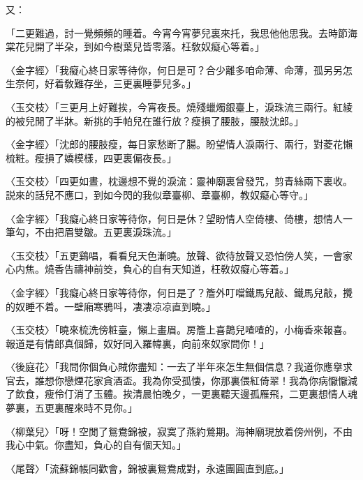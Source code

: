 又：

\begin{myquote}
「二更難過，討一覺頻頻的睡着。今宵今宵夢兒裏來托，我思他他思我。去時節海棠花兒開了半朶，到如今樹葉兒皆零落。枉敎奴癡心等着。」

{\markfont〈金字經〉}「我癡心終日家等待你，何日是可？合少離多咱命薄、命薄，孤另另怎生奈何，好着敎難存坐，三更裏睡夢兒多。」

{\markfont〈玉交枝〉}「三更月上好難挨，今宵夜長。燒殘蠟燭銀臺上，淚珠流三兩行。紅綾的被兒閒了半牀。新挑的手帕兒在誰行放？瘦損了腰肢，腰肢沈郎。」

{\markfont〈金字經〉}「沈郎的腰肢瘦，每日家愁断了腸。盼望情人淚兩行、兩行，對菱花懶梳粧。瘦損了嬌模樣，四更裏偏夜長。」

{\markfont〈玉交枝〉}「四更如晝，枕邊想不覺的淚流：靈神廟裏曾發咒，剪青絲兩下裏收。説來的話兒不應口，到如今閃的我似章臺柳、章臺柳，教奴癡心等守。」

{\markfont〈金字經〉}「我癡心終日家等待你，何日是休？望盼情人空倚樓、倚樓，想情人一筆勾，不由把眉雙皺。五更裏淚珠流。」　

{\markfont〈玉交枝〉}「五更鷄唱，看看兒天色漸曉。放聲、欲待放聲又恐怕傍人笑，一會家心内焦。燒香告禱神前筊，負心的自有天知道，枉敎奴癡心等着。」

{\markfont〈金字經〉}「我癡心終日家等待你，何日是了？簷外叮噹鐵馬兒敲、鐵馬兒敲，攪的奴睡不着。一壁廂寒鴉呌，凄凄凉凉直到曉。」

{\markfont〈玉交枝〉}「曉來梳洗傍粧臺，懶上畫眉。房簷上喜鵲兒喳喳的，小梅香來報喜。報道是有情郎真個歸，奴好同入羅幃裏，向前來奴家問你！」　

{\markfont〈後庭花〉}「我問你個負心賊你盡知：一去了半年來怎生無個信息？我道你應擧求官去，誰想你戀煙花家貪酒盃。我為你受孤悽，你那裏偎紅倚翠！我為你病懨懨減了飲食，瘦伶仃消了玉體。挨清晨怕晚夕，一更裏聽天邊孤雁飛，二更裏想情人魂夢裏，五更裏醒來時不見你。」

{\markfont〈柳葉兒〉}「呀！空閒了鴛鴦錦被，寂寞了燕約鶯期。海神廟現放着傍州例，不由我心中氣。你盡知，負心的自有個天知。」

{\markfont〈尾聲〉}「流蘇錦帳同歡會，錦被裏鴛鴦成對，永遠團圓直到底。」
\end{myquote}

